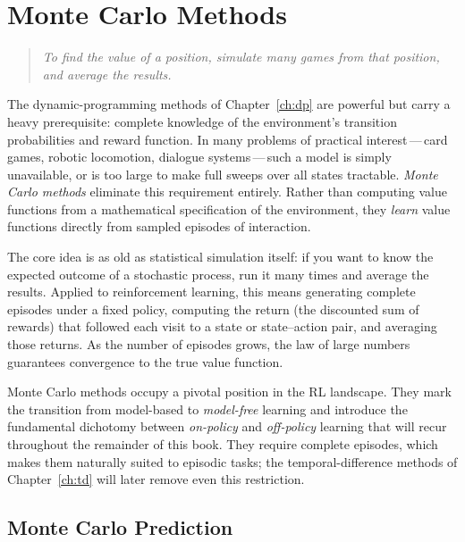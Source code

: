 \chapter{Monte Carlo Methods}
\label{ch:mc}

\begin{quote}
\itshape
To find the value of a position, simulate many games from that position, and average the results.
\end{quote}

\bigskip

The dynamic-programming methods of Chapter~\ref{ch:dp} are powerful but carry a heavy prerequisite: complete knowledge of the environment's transition probabilities and reward function.  In many problems of practical interest\,---\,card games, robotic locomotion, dialogue systems\,---\,such a model is simply unavailable, or is too large to make full sweeps over all states tractable.  \emph{Monte Carlo methods} eliminate this requirement entirely.  Rather than computing value functions from a mathematical specification of the environment, they \emph{learn} value functions directly from sampled episodes of interaction.

The core idea is as old as statistical simulation itself: if you want to know the expected outcome of a stochastic process, run it many times and average the results.  Applied to reinforcement learning, this means generating complete episodes under a fixed policy, computing the return (the discounted sum of rewards) that followed each visit to a state or state--action pair, and averaging those returns.  As the number of episodes grows, the law of large numbers guarantees convergence to the true value function.

Monte Carlo methods occupy a pivotal position in the RL landscape.  They mark the transition from model-based to \emph{model-free} learning and introduce the fundamental dichotomy between \emph{on-policy} and \emph{off-policy} learning that will recur throughout the remainder of this book.  They require complete episodes, which makes them naturally suited to episodic tasks; the temporal-difference methods of Chapter~\ref{ch:td} will later remove even this restriction.


\section{Monte Carlo Prediction}
\label{sec:mc-prediction}

